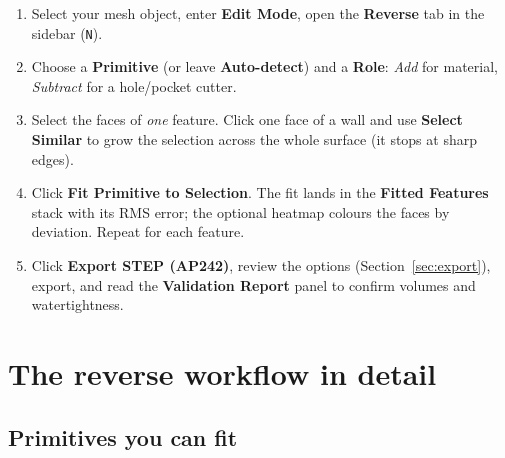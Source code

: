 \documentclass[11pt,a4paper]{article}
\newcommand{\ui}[1]{\textsf{\textbf{#1}}}   %
\begin{document}
\begin{enumerate}[nosep]
  \item Select your mesh object, enter \textbf{Edit Mode}, open the
    \ui{Reverse} tab in the sidebar (\texttt{N}).
  \item Choose a \ui{Primitive} (or leave \ui{Auto-detect}) and a \ui{Role}:
    \emph{Add} for material, \emph{Subtract} for a hole/pocket cutter.
  \item Select the faces of \emph{one} feature. Click one face of a wall and
    use \ui{Select Similar} to grow the selection across the whole surface
    (it stops at sharp edges).
  \item Click \ui{Fit Primitive to Selection}. The fit lands in the
    \ui{Fitted Features} stack with its RMS error; the optional heatmap
    colours the faces by deviation. Repeat for each feature.
  \item Click \ui{Export STEP (AP242)}, review the options
    (Section~\ref{sec:export}), export, and read the \ui{Validation Report}
    panel to confirm volumes and watertightness.
\end{enumerate}

\section{The reverse workflow in detail}
\label{sec:reverse}

\subsection{Primitives you can fit}
\end{document}

